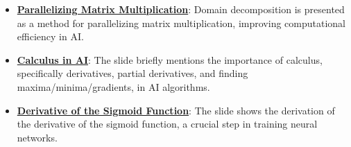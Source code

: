 \documentclass{article}%
\begin{document}
\begin{itemize}[leftmargin=*]
\item \href{https://purdue.brightspace.com/d2l/common/assets/pdfjs-d2l-dist/1.0.14-legacy/web/viewer.html?file=\%2Fcontent\%2Fenforced\%2F1095467-wl.202510.CS.24300.001\%2F04L1-Linear Algebra Primer.pdf\%3Fou\%3D1095467\&lang=en-us\&container=d2l-fileviewer-rendered-pdf\&fullscreen=d2l-fileviewer-rendered-pdf-dialog\&height=667#page=18}{\textbf{Parallelizing Matrix Multiplication}}: Domain decomposition is presented as a method for parallelizing matrix multiplication, improving computational efficiency in AI.%
\item \href{https://purdue.brightspace.com/d2l/common/assets/pdfjs-d2l-dist/1.0.14-legacy/web/viewer.html?file=\%2Fcontent\%2Fenforced\%2F1095467-wl.202510.CS.24300.001\%2F04L1-Linear Algebra Primer.pdf\%3Fou\%3D1095467\&lang=en-us\&container=d2l-fileviewer-rendered-pdf\&fullscreen=d2l-fileviewer-rendered-pdf-dialog\&height=667#page=19}{\textbf{Calculus in AI}}: The slide briefly mentions the importance of calculus, specifically derivatives, partial derivatives, and finding maxima/minima/gradients, in AI algorithms.%
\item \href{https://purdue.brightspace.com/d2l/common/assets/pdfjs-d2l-dist/1.0.14-legacy/web/viewer.html?file=\%2Fcontent\%2Fenforced\%2F1095467-wl.202510.CS.24300.001\%2F04L1-Linear Algebra Primer.pdf\%3Fou\%3D1095467\&lang=en-us\&container=d2l-fileviewer-rendered-pdf\&fullscreen=d2l-fileviewer-rendered-pdf-dialog\&height=667#page=21}{\textbf{Derivative of the Sigmoid Function}}: The slide shows the derivation of the derivative of the sigmoid function, a crucial step in training neural networks.%
\end{itemize}%
\end{document}
